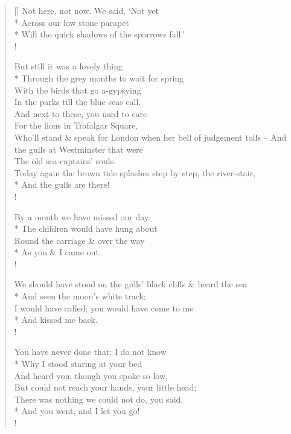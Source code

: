 \documentclass[MAIN]{subfiles}
\begin{document}
\begin{verse}[\versewidth]
\vin \vin Not here, not now. We said, `Not yet\\*
\vin \vin Across our low stone parapet\\*
\vin Will the quick shadows of the sparrows fall.'\\!

\vin \vin But still it was a lovely thing\\*
\vin \vin Through the grey months to wait for spring\\
\vin \vin With the birds that go a-gypsying\\
\vin In the parks till the blue seas call.\\
\vin \vin And next to these, you used to care\\
\vin \vin For the lions in {\sc Trafalgar Square},\\
Who'll stand \& speak for {\sc London} when her bell of judgement tolls --
\vin \vin And the gulls at {\sc Westminster} that were\\
\vin \vin The old sea-captains' souls.\\
Today again the brown tide splashes step by step, the river-stair,\\*
\vin \vin And the gulls are there!\\!

By a month we have missed our day:\\*
\vin The children would have hung about\\
Round the carriage \& over the way\\*
\vin As you \& I came out.\\!

We should have stood on the gulls' black cliffs \& heard the sea\\*
\vin And seen the moon's white track;\\
I would have called; you would have come to me\\*
\vin And kissed me back.\\!

You have never done that: I do not know\\*
\vin Why I stood staring at your bed\\
And heard you, though you spoke so low,\\
\vin But could not reach your hands, your little head;\\
There was nothing we could not do, you said,\\*
\vin And you went, and I let you go!\\!


\end{verse}
\end{document}
